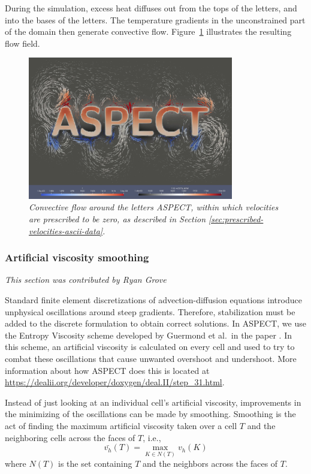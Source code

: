 \documentclass{article}
\newcommand{\aspect}{\textsc{ASPECT}}
\begin{document}
During the simulation, excess heat diffuses out from the tops of the letters, and
into the bases of the letters. The temperature gradients in the unconstrained
part of the domain then generate convective flow. Figure~\ref{fig:prescribed-velocity-ascii-data}
illustrates the resulting flow field.
\begin{figure}
    \centering
    \includegraphics[width=0.8\textwidth]{cookbooks/prescribed_velocity_ascii_data/doc/prescribed_velocity_ascii_data.png}
    \caption{\it Convective flow around the letters ASPECT, within which velocities are prescribed to be zero, as described in Section \ref{sec:prescribed-velocities-ascii-data}.}
    \label{fig:prescribed-velocity-ascii-data}
\end{figure}


\subsubsection{Artificial viscosity smoothing}
\label{sec:artificial-viscosity-smoothing}
\textit{This section was contributed by Ryan Grove}

Standard finite element discretizations of advection-diffusion equations introduce unphysical oscillations around steep gradients. Therefore, stabilization must be added to the discrete formulation to obtain correct solutions. In ASPECT, we use the Entropy Viscosity scheme developed by Guermond et al.~in the paper \cite{guer11}. In this scheme, an artificial viscosity is calculated on every cell and used to try to combat these oscillations that cause unwanted overshoot and undershoot.  More information about how \aspect{} does this is located at \url{https://dealii.org/developer/doxygen/deal.II/step_31.html}.

Instead of just looking at an individual cell's artificial viscosity, improvements in the minimizing of the oscillations can be made by smoothing.  Smoothing is the act of finding the maximum artificial viscosity taken over a cell $T$ and the neighboring cells across the faces of $T$, i.e.,
\begin{equation*}
\bar{v_h}(T) = \max_{K \in N(T)} v_h(K)
\end{equation*}
where $N(T)$ is the set containing $T$ and the neighbors across the faces of $T$.
\end{document}
